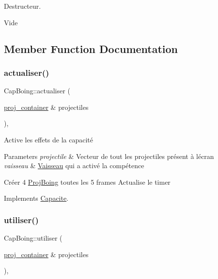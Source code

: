Destructeur. 

Vide 

\subsection{Member Function Documentation}
\mbox{\label{class_cap_boing_a2bf6f58f93ff52263cf9926e4d91c239}} 
\subsubsection{\texorpdfstring{actualiser()}{actualiser()}}
{\footnotesize\ttfamily Cap\+Boing\+::actualiser (\begin{DoxyParamCaption}\item[{\mbox{\hyperlink{def__type_8h_a87980cd8ee9533e561a73e8bbc728188}{proj\+\_\+container}} \&}]{projectiles }\end{DoxyParamCaption})\hspace{0.3cm}{\ttfamily [override]}, {\ttfamily [virtual]}}



Active les effets de la capacité 


\begin{DoxyParams}{Parameters}
{\em projectile} & Vecteur de tout les projectiles présent à l\textquotesingle{}écran \\
\hline
{\em vaisseau} & \mbox{\hyperlink{class_vaisseau}{Vaisseau}} qui a activé la compétence\\
\hline
\end{DoxyParams}
Créer 4 \mbox{\hyperlink{class_proj_boing}{Proj\+Boing}} toutes les 5 frames Actualise le timer 

Implements \mbox{\hyperlink{class_capacite_a85355aeb1d4acc049ed97da177acbd5f}{Capacite}}.

\mbox{\label{class_cap_boing_a879dfeba930a0be60873ef3403a35eb1}} 
\subsubsection{\texorpdfstring{utiliser()}{utiliser()}}
{\footnotesize\ttfamily Cap\+Boing\+::utiliser (\begin{DoxyParamCaption}\item[{\mbox{\hyperlink{def__type_8h_a87980cd8ee9533e561a73e8bbc728188}{proj\+\_\+container}} \&}]{projectiles }\end{DoxyParamCaption})\hspace{0.3cm}{\ttfamily [override]}, {\ttfamily [virtual]}}



